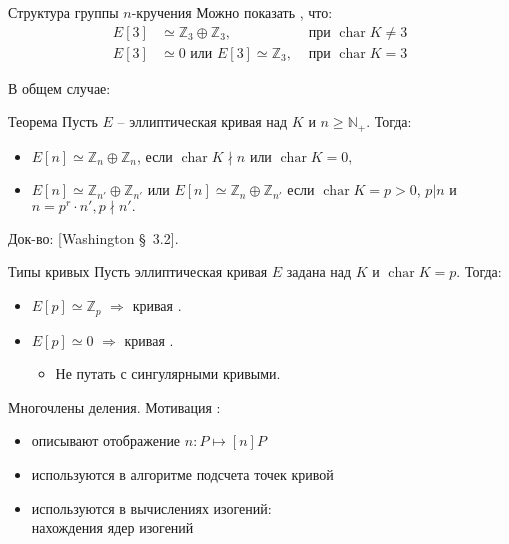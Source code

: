 \documentclass{beamer}
\begin{document}
\begin{frame}{Структура группы $n$-кручения}
Можно показать%
, что:
\begin{align*}
    E[3] &\simeq \mathbb{Z}_3 \oplus \mathbb{Z}_3, & {\text{ при }}\operatorname{char} K \ne 3 \\
    E[3] &\simeq 0 \text{ или } E[3] \simeq \mathbb{Z}_3, & {\text{ при }} \operatorname{char} K = 3
\end{align*}

В общем случае:

\begin{block}{Теорема}
    Пусть $E$ -- эллиптическая кривая над $K$ и $n \geqslant \mathbb{N}_+$. Тогда:
    \begin{itemize}
        \item $E[n] \simeq \mathbb{Z}_n \oplus \mathbb{Z}_n$, если $\operatorname{char} K \nmid n$ или $\operatorname{char} K = 0,$  
        \item $E[n] \simeq \mathbb{Z}_{n'} \oplus \mathbb{Z}_{n'}$ или $E[n] \simeq {\mathbb{Z}_n} \oplus \mathbb{Z}_{n'}$ если $\operatorname{char} K = p > 0$, $p|n$
        и $n = p^r \cdot n', p \nmid n'.$
    \end{itemize}
\end{block}
\ProofBegin
Док-во: [Washington \S~3.2].
\ProofEnd
\end{frame}

\begin{frame}{Типы кривых}
    Пусть эллиптическая кривая $E$ задана над $K$ и $\operatorname{char} K = p$. Тогда:
    \begin{itemize}
        \item $E[p] \simeq \mathbb{Z}_p$ $\Rightarrow$ кривая .
        \item $E[p] \simeq 0$ $\Rightarrow$ кривая .
        \begin{itemize}
            \item[\faExclamationTriangle] Не путать с сингулярными кривыми.
        \end{itemize}
    \end{itemize}
\end{frame}

\begin{frame}{Многочлены деления. Мотивация}
:
\begin{itemize}
    \item описывают отображение $n: P \mapsto [n] P$
    \item используются в алгоритме подсчета точек кривой
    \item используются в вычислениях изогений:\\
    нахождения ядер изогений
\end{itemize}
\end{frame}
\end{document}
